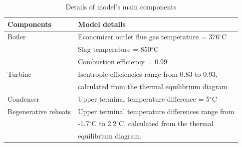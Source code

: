 \documentclass[preprint,12pt]{elsarticle}
\begin{document}
\begin{table}
\caption{Details of model's main components}
\label{table:model_details}
\begin{centering}
\begin{tabular}{ll}
\toprule 
Components 				& Model details\tabularnewline
\midrule
Boiler         			& Economizer outlet flue gas temperature = 376$^\circ$C \tabularnewline
 						& Slag temperature = 850$^\circ$C \tabularnewline
 						& Combustion efficiency = 0.99\tabularnewline
Turbine 				& Isentropic efficiencies range from 0.83 to 0.93, \tabularnewline
 						& calculated from the thermal equilibrium diagram\tabularnewline
Condenser 				& Upper terminal temperature difference = 5$^\circ$C \tabularnewline
Regenerative reheats 	& Upper terminal temperature differences range from  \tabularnewline
 						& -1.7$^\circ$C{} to 2.2$^\circ$C, calculated from the thermal\tabularnewline
 						& equilibrium diagram.\tabularnewline
\bottomrule
\end{tabular}
\par\end{centering}
\end{table}
\end{document}
